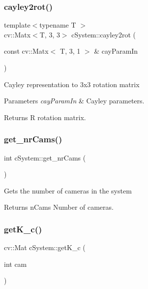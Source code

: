 \subsubsection{\texorpdfstring{cayley2rot()}{cayley2rot()}}
{\footnotesize\ttfamily template$<$typename T $>$ \\
cv\+::\+Matx$<$T, 3, 3$>$ c\+System\+::cayley2rot (\begin{DoxyParamCaption}\item[{const cv\+::\+Matx$<$ T, 3, 1 $>$ \&}]{cay\+Param\+In }\end{DoxyParamCaption})\hspace{0.3cm}{\ttfamily [inline]}}

Cayley representation to 3x3 rotation matrix 
\begin{DoxyParams}{Parameters}
{\em cay\+Param\+In} & Cayley parameters. \\
\hline
\end{DoxyParams}
\begin{DoxyReturn}{Returns}
R rotation matrix. 
\end{DoxyReturn}
\mbox{\label{classcSystem_ae1fa352a5d3ac3a9ce3d4dc1d0d3ee08}} 
\subsubsection{\texorpdfstring{get\+\_\+nr\+Cams()}{get\_nrCams()}}
{\footnotesize\ttfamily int c\+System\+::get\+\_\+nr\+Cams (\begin{DoxyParamCaption}{ }\end{DoxyParamCaption})}

Gets the number of cameras in the system \begin{DoxyReturn}{Returns}
n\+Cams Number of cameras. 
\end{DoxyReturn}
\mbox{\label{classcSystem_a2c5e497f4a8fd27d9a4a67f8de329b02}} 
\subsubsection{\texorpdfstring{get\+K\+\_\+c()}{getK\_c()}}
{\footnotesize\ttfamily cv\+::\+Mat c\+System\+::get\+K\+\_\+c (\begin{DoxyParamCaption}\item[{int}]{cam }\end{DoxyParamCaption})}

